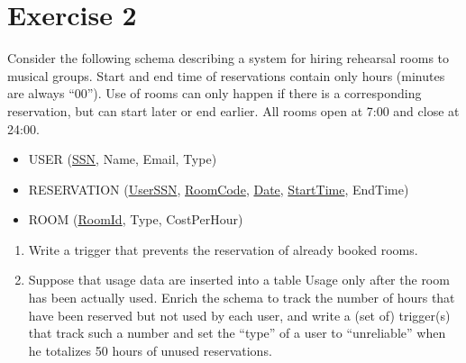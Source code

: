 \section{Exercise 2}

Consider the following schema describing a system for hiring rehearsal rooms to musical groups. 
Start and end time of reservations contain only hours (minutes are always “00”). 
Use of rooms can only happen if there is a corresponding reservation, but can start later or end earlier. 
All rooms open at 7:00 and close at 24:00.
\begin{itemize}
    \item USER (\underline{SSN}, Name, Email, Type)
    \item RESERVATION (\underline{UserSSN}, \underline{RoomCode}, \underline{Date}, \underline{StartTime}, EndTime)
    \item ROOM (\underline{RoomId}, Type, CostPerHour)
\end{itemize}
\begin{enumerate}
    \item Write a trigger that prevents the reservation of already booked rooms. 
    \item Suppose that usage data are inserted into a table Usage only after the room has been actually used. 
        Enrich the schema to track the number of hours that have been reserved but not used by each user, and write a (set of) trigger(s) that track such a number and set the “type” of a user to “unreliable” when he totalizes 50 hours of unused reservations.
\end{enumerate}

